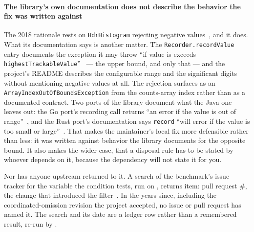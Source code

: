 \documentclass[10pt,journal,onecolumn]{IEEEtran}
\begin{document}
\paragraph{The library's own documentation does not describe the behavior the fix was
written against} The 2018 rationale rests on \texttt{HdrHistogram} rejecting negative
values~\cite{openmessaging_pr56}, and it does. What its documentation says is another matter. The
\texttt{Recorder.recordValue} entry documents the exception it may throw ``if value is
exceeds \texttt{highestTrackableValue}''~\cite{hdrhistogram_javadoc} --- the upper bound,
and only that --- and the project's README describes the configurable range and the
significant digits without mentioning negative values at all. The rejection surfaces as an
\texttt{ArrayIndexOutOfBoundsException} from the counts-array index rather than as a
documented contract. Two ports of the library document what the Java one leaves out: the Go
port's recording call returns ``an error if the value is out of
range''~\cite{hdrhistogram_go}, and the Rust port's documentation says \texttt{record} ``will
error if the value is too small or large''~\cite{hdrhistogram_rust}. That makes the
maintainer's local fix more defensible rather than
less: it was written against behavior the library documents for the opposite bound. It
also makes the wider case, that a disposal rule has to be stated by whoever depends on it,
because the dependency will not state it for you.

Nor has anyone upstream returned to it. A search of the benchmark's issue tracker for the
variable the condition tests, run on \ombTrackerChecked{}, returns \ombTrackerItems{} item:
pull request \#\ombTrackerFirstItem{}, the change that introduced the
filter~\cite{openmessaging_pr56}. In the \ombTrackerYearsWord{} years since, including the
coordinated-omission revision the project accepted, no issue or pull request has named it.
The search and its date are a ledger row rather than a remembered result, re-run by
.

\end{document}
